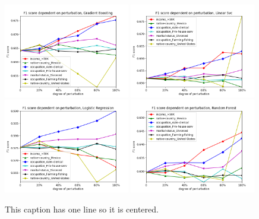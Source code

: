 \documentclass[a4paper,twoside]{article}
\begin{document}
\begin{figure}[h]
	\centering
	\includegraphics[width=0.49\textwidth]{figures/perturbation/adults_education_num/gradient_boost}
	\includegraphics[width=0.49\textwidth]{figures/perturbation/adults_education_num/linear_svc}
	\includegraphics[width=0.49\textwidth]{figures/perturbation/adults_education_num/logistic_regression}
	\includegraphics[width=0.49\textwidth]{figures/perturbation/adults_education_num/random_forest}
	\caption{This caption has one line so it is centered.}
	\label{fig:results_anonymization_education_num}
\end{figure}
\end{document}
